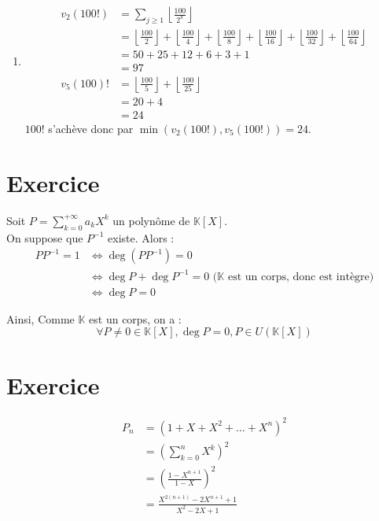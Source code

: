 \documentclass{report}
\begin{document}
\begin{enumerate}
    \item \begin{align*}
        v_2(100!) &= \sum_{j \geq 1} \left\lfloor \frac{100}{2^k} \right\rfloor \\
        &=  \left\lfloor \frac{100}{2} \right\rfloor + \left\lfloor \frac{100}{4} \right\rfloor + \left\lfloor \frac{100}{8} \right\rfloor + \left\lfloor \frac{100}{16} \right\rfloor + \left\lfloor \frac{100}{32} \right\rfloor + \left\lfloor \frac{100}{64} \right\rfloor \\
        &= 50 + 25 + 12 + 6 + 3 + 1 \\
        &= 97 \\
        v_5(100)! &= \left\lfloor \frac{100}{5} \right\rfloor + \left\lfloor \frac{100}{25} \right\rfloor \\
        &= 20 + 4 \\
        &= 24
    \end{align*}
    $100!$ s'achève donc par $\min(v_2(100!), v_5(100!)) = 24$. 
\end{enumerate}

\setcounter{chapter}{13}
\setcounter{section}{0}
\section{Exercice}

Soit $P = \sum\limits_{k=0}^{+\infty} a_k X^k$ un polynôme de $\mathbb{K}[X]$. \\

\noindent On suppose que $P^{-1}$ existe. Alors : 
\begin{align*}
    PP^{-1} = 1 &\Leftrightarrow \deg(PP^{-1}) = 0 \\
    &\Leftrightarrow \deg{P} + \deg{P^{-1}} = 0  \text{ ($\mathbb{K}$ est un corps, donc est intègre)}\\
    &\Leftrightarrow \deg{P} = 0
\end{align*}

\noindent Ainsi, Comme $\mathbb{K}$ est un corps, on a : 
$$\forall P \neq 0 \in \mathbb{K}[X], \deg{P} = 0, P \in U(\mathbb{K}[X])$$


\section{Exercice}
\begin{align*}
    P_n &= (1 + X + X^2 + \dots + X^n)^2 \\
    &= \left( \sum_{k=0}^{n} X^k \right)^2 \\
    &= \left( \frac{1 - X^{n+1}}{1 - X} \right)^2 \\
    &= \frac{X^{2(n+1)} - 2X^{n+1} + 1}{X^2 - 2X + 1}
\end{align*}
\end{document}
